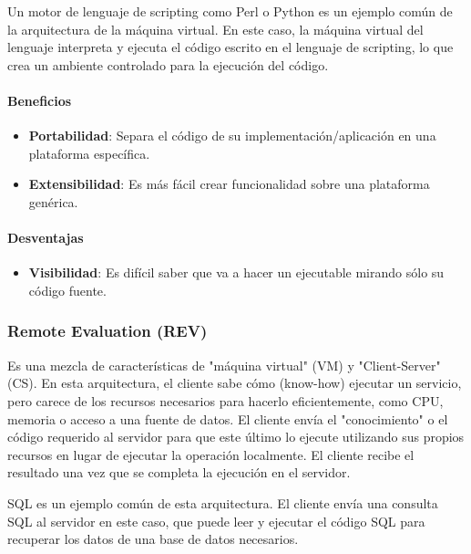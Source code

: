 \documentclass{article}
\begin{document}
		Un motor de lenguaje de scripting como Perl o Python es un ejemplo común de la arquitectura de la máquina virtual. En este caso, la máquina virtual del lenguaje interpreta y ejecuta el código escrito en el lenguaje de scripting, lo que crea un ambiente controlado para la ejecución del código.
		
		\paragraph{Beneficios}
		\begin{itemize}	
			\item {\textbf{Portabilidad}}: Separa el código de su implementación/aplicación en
			una plataforma específica.
			
			\item {\textbf{Extensibilidad}}: Es más fácil crear funcionalidad sobre una plataforma
			genérica.
			
		\end{itemize}
		
		\paragraph{Desventajas}
		\begin{itemize}	
			\item {\textbf{Visibilidad}}: Es difícil saber que va a hacer un ejecutable mirando
			sólo su código fuente.			
		\end{itemize}
		\subsubsection{Remote Evaluation (REV)}
		Es una mezcla de características de "máquina virtual" (VM) y "Client-Server" (CS). En esta arquitectura, el cliente sabe cómo (know-how) ejecutar un servicio, pero carece de los recursos necesarios para hacerlo eficientemente, como CPU, memoria o acceso a una fuente de datos. El cliente envía el "conocimiento" o el código requerido al servidor para que este último lo ejecute utilizando sus propios recursos en lugar de ejecutar la operación localmente. El cliente recibe el resultado una vez que se completa la ejecución en el servidor.
		
		SQL es un ejemplo común de esta arquitectura. El cliente envía una consulta SQL al servidor en este caso, que puede leer y ejecutar el código SQL para recuperar los datos de una base de datos necesarios.
		
\end{document}
